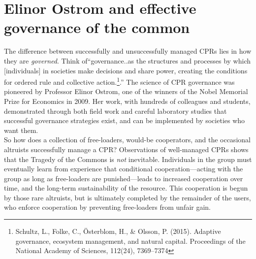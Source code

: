 \documentclass[amstex,12pt]{book}
\begin{document}
\section{Elinor Ostrom and effective governance of the common}
The difference between successfully and unsuccessfully managed CPRs lies in how they are \emph{governed}. Think of``governance..as the structures and processes by which [individuals] in societies make decisions and share power, creating the conditions for ordered rule and collective action.\footnote{Schultz, L., Folke, C., Österblom, H., \& Olsson, P. (2015). Adaptive governance, ecosystem management, and natural capital. Proceedings of the National Academy of Sciences, 112(24), 7369–7374}.'' The science of CPR governance was pioneered by Professor Elinor Ostrom, one of the winners of the Nobel Memorial Prize for Economics in 2009. Her work, with hundreds of colleagues and students, demonstrated through both field work and careful laboratory studies that successful governance strategies exist, and can be implemented by societies who want them.\\

So how does a collection of free-loaders, would-be cooperators, and the occasional altruists successfully manage a CPR? Observations of well-managed CPRs shows that the Tragedy of the Commons is \emph{not} inevitable.  Individuals in the group must eventually learn from experience that conditional cooperation---acting with the group as long as free-loaders are punished---leads to increased cooperation over time, and the long-term sustainability of the resource. This cooperation is begun by those rare altruists, but is ultimately completed by the remainder of the users, who enforce cooperation by preventing free-loaders from unfair gain. 
\end{document}
